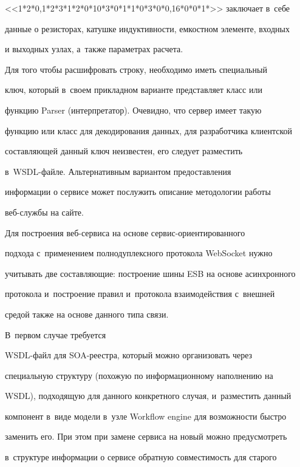 <<1*2*0,1*2*3*1*2*0*10*3*0*1*1*0*3*0*0,16*0*0*1*>> заключает в~себе 


данные о резисторах, катушке индуктивности, емкостном элементе, входных 


и выходных узлах, а~также параметрах расчета.


     


     Для того чтобы расшифровать строку, необходимо иметь специальный 


ключ, который в~своем прикладном варианте представляет класс или 


функцию Parser (интерпретатор). Очевидно, что сервер имеет такую 


функцию или класс для декодирования данных, для разработчика клиентской 


составляющей данный ключ неизвестен, его следует разместить 


     в~WSDL-фай\-ле. Альтернативным вариантом предоставления 


информации о сервисе может послужить описание методологии работы  


веб-служ\-бы на сайте.


     


     Для построения веб-сервиса на основе сер\-вис-ори\-ен\-ти\-ро\-ван\-но\-го 


подхода с~применением полнодуплексного протокола WebSocket нужно 


учитывать две составляющие: построение шины ESB на основе асинхронного 


протокола и~построение правил и~протокола взаимодействия с~внешней 


средой также на основе данного типа связи. 





В~первом случае требуется 


WSDL-файл для SOA-ре\-естра, который можно организовать через 


специальную структуру (похожую по информационному наполнению на 


WSDL), подходящую для данного конкретного случая, и~раз\-мес\-тить данный 


компонент в~виде модели в~узле Workflow engine для возможности быстро 


заменить его. При этом при замене сервиса на новый можно пред\-усмот\-реть 


в~структуре информации о сервисе обратную совместимость для старого 


